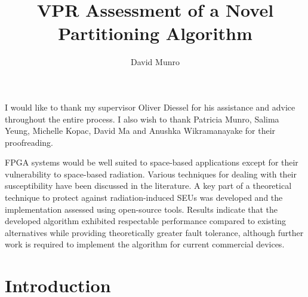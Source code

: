 \documentclass[12pt,final,oneside,a4paper]{dwThesis} %
\title{VPR Assessment of a Novel Partitioning Algorithm}
\author{David Munro}
\begin{document}
   \maketitle

   \begin{acknowledgements}
      I would like to thank my supervisor Oliver Diessel
      for his assistance and advice throughout the entire process. I also wish
      to thank Patricia Munro, Salima Yeung, Michelle Kopac, David Ma and Anushka Wikramanayake for their proofreading.


   \end{acknowledgements}

   \begin{abstracts}
      \gls{FPGA} systems would be well
      suited to space-based applications except for their vulnerability to
      space-based radiation. Various techniques for dealing with their
      susceptibility have been discussed in the literature.
      A key part of a theoretical technique to protect against radiation-induced \glspl{SEU}
      was developed and the implementation assessed using open-source tools.
      Results indicate that the developed algorithm exhibited respectable performance compared
      to existing alternatives while providing theoretically greater fault tolerance, although further work is required to implement 
      the algorithm for current commercial devices.
      
      
   \end{abstracts}
   \newpage \tableofcontents*
   \listoftables
   \listoffigures
   \listoffixmes \newpage \printglossaries 

   \glsresetall
   \chapter{Introduction}
\end{document}
